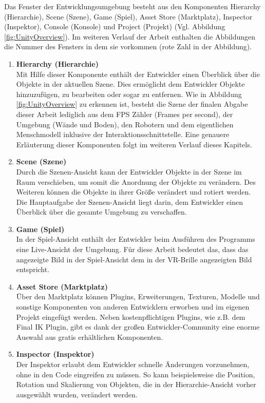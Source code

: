 \newpage
\noindent Das Fenster der Entwicklungsumgebung besteht aus den Komponenten Hierarchy (Hierarchie), Scene (Szene), Game (Spiel), Asset Store (Marktplatz), Inspector (Inspektor), Console (Konsole) und Project (Projekt) (Vgl. Abbildung \ref{fig:UnityOverview}). Im weiteren Verlauf der Arbeit enthalten die Abbildungen die Nummer des Fensters in dem sie vorkommen (rote Zahl in der Abbildung).
\begin{enumerate}
	\item \textbf{Hierarchy (Hierarchie)} \\
	Mit Hilfe dieser Komponente enthält der Entwickler einen Überblick über die Objekte in der aktuellen Szene. Dies ermöglicht dem Entwickler Objekte hinzuzufügen, zu bearbeiten oder sogar zu entfernen. Wie in Abbildung \ref{fig:UnityOverview} zu erkennen ist, besteht die Szene der finalen Abgabe dieser Arbeit lediglich aus dem FPS Zähler (Frames per second), der Umgebung (Wände und Boden), den Robotern und dem eigentlichen Menschmodell inklusive der Interaktionsschnittstelle. Eine genauere Erläuterung dieser Komponenten folgt im weiteren Verlauf dieses Kapitels.
	\item \textbf{Scene (Szene)} \\
	Durch die Szenen-Ansicht kann der Entwickler Objekte in der Szene im Raum verschieben, um somit die Anordnung der Objekte zu verändern. Des Weiteren können die Objekte in ihrer Größe verändert und rotiert werden. Die Hauptaufgabe der Szenen-Ansicht liegt darin, dem Entwickler einen Überblick über die gesamte Umgebung zu verschaffen.
	\item \textbf{Game (Spiel)} \\
	In der Spiel-Ansicht enthält der Entwickler beim Ausführen des Programms eine Live-Ansicht der Umgebung. Für diese Arbeit bedeutet das, dass das angezeigte Bild in der Spiel-Ansicht dem in der VR-Brille angezeigten Bild entspricht.
	\item \textbf{Asset Store (Marktplatz)} \\
	Über den Marktplatz können Plugins, Erweiterungen, Texturen, Modelle und sonstige Komponenten von anderen Entwicklern erworben und im eigenen Projekt eingefügt werden. Neben kostenpflichtigen Plugins, wie z.B. dem Final IK Plugin, gibt es dank der großen Entwickler-Community eine enorme Auswahl aus gratis erhältlichen Komponenten.
	\item \textbf{Inspector (Inspektor)} \\
	Der Inspektor erlaubt dem Entwickler schnelle Änderungen vorzunehmen, ohne in den Code eingreifen zu müssen. So kann beispielsweise die Position, Rotation und Skalierung von Objekten, die in der Hierarchie-Ansicht vorher ausgewählt wurden, verändert werden.

\end{enumerate}
